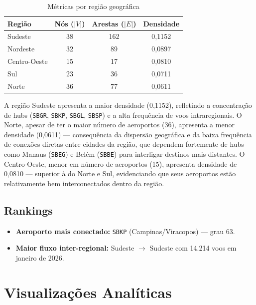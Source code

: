\documentclass[12pt,a4paper]{article}
\begin{document}
\begin{table}[H]
\centering
\caption{Métricas por região geográfica}
\begin{tabular}{lccc}
\toprule
\textbf{Região} & \textbf{Nós ($|V|$)} & \textbf{Arestas ($|E|$)} & \textbf{Densidade} \\
\midrule
Sudeste      & 38 & 162 & 0{,}1152 \\
Nordeste     & 32 &  89 & 0{,}0897 \\
Centro-Oeste & 15 &  17 & 0{,}0810 \\
Sul          & 23 &  36 & 0{,}0711 \\
Norte        & 36 &  77 & 0{,}0611 \\
\bottomrule
\end{tabular}
\end{table}

A região Sudeste apresenta a maior densidade (0{,}1152), refletindo a concentração de hubs
(\texttt{SBGR}, \texttt{SBKP}, \texttt{SBGL}, \texttt{SBSP}) e a alta frequência de voos
intraregionais. O Norte, apesar de ter o maior número de aeroportos (36), apresenta a menor
densidade (0{,}0611) --- consequência da dispersão geográfica e da baixa frequência de conexões
diretas entre cidades da região, que dependem fortemente de hubs como Manaus (\texttt{SBEG}) e
Belém (\texttt{SBBE}) para interligar destinos mais distantes. O Centro-Oeste, menor em número
de aeroportos (15), apresenta densidade de 0{,}0810 --- superior à do Norte e Sul, evidenciando
que seus aeroportos estão relativamente bem interconectados dentro da região.

\subsection{Rankings}

\begin{itemize}
    \item \textbf{Aeroporto mais conectado:} \texttt{SBKP} (Campinas/Viracopos) --- grau 63.
    \item \textbf{Maior fluxo inter-regional:} Sudeste $\rightarrow$ Sudeste com 14.214 voos em
          janeiro de 2026.
\end{itemize}

\section{Visualizações Analíticas}
\end{document}
